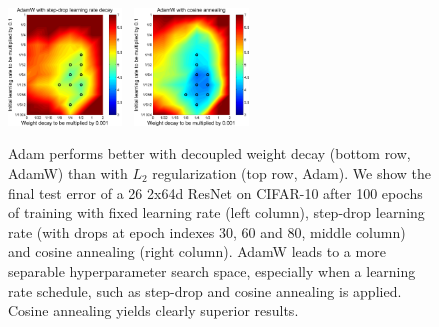 \documentclass[usenames,dvipsnames]{article} %
\begin{document}
\begin{figure}[t]
\begin{center}
  \includegraphics[width=0.27\textwidth]{mADAMstepdrop.pdf}~
  \includegraphics[width=0.27\textwidth]{mADAMwithcosine.pdf}\\
\caption{\label{fig:adam_with_without_cosine_stepdrop} Adam performs better with decoupled weight decay (bottom row, AdamW) than with $L_2$ regularization (top row, Adam). We show the final test error of a 26 2x64d ResNet on CIFAR-10 after 100 epochs of training with fixed learning rate (left column), step-drop learning rate (with drops at epoch indexes 30, 60 and 80, middle column) and cosine annealing (right column). AdamW leads to a more separable hyperparameter search space, especially when a learning rate schedule, such as step-drop and cosine annealing is applied. Cosine annealing yields clearly superior results. 
}
\end{center}
\end{figure}

\end{document}
